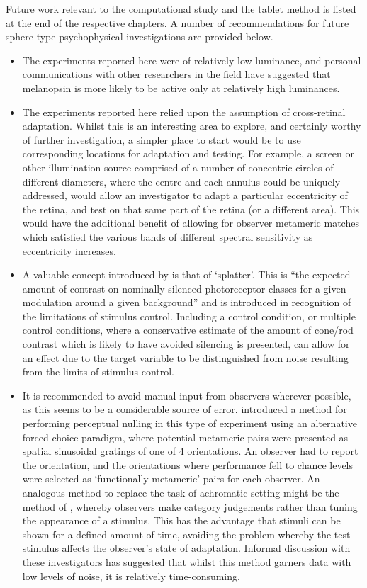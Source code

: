Future work relevant to the computational study and the tablet method is listed at the end of the respective chapters. A number of recommendations for future sphere-type psychophysical investigations are provided below.

\begin{itemize}
\item The experiments reported here were of relatively low luminance, and personal communications with other researchers in the field have suggested that melanopsin is more likely to be active only at relatively high luminances.
\item The experiments reported here relied upon the assumption of cross-retinal adaptation. Whilst this is an interesting area to explore, and certainly worthy of further investigation, a simpler place to start would be to use corresponding locations for adaptation and testing. For example, a screen or other illumination source comprised of a number of concentric circles of different diameters, where the centre and each annulus could be uniquely addressed, would allow an investigator to adapt a particular eccentricity of the retina, and test on that same part of the retina (or a different area). This would have the additional benefit of allowing for observer metameric matches which satisfied the various bands of different spectral sensitivity as eccentricity increases.
\item A valuable concept introduced by \citet{spitschan_selective_2015} is that of `splatter'. This is ``the expected amount of contrast on nominally silenced photoreceptor
classes for a given modulation around a given background'' and is introduced in recognition of the limitations of stimulus control. Including a control condition, or multiple control conditions, where a conservative estimate of the amount of cone/rod contrast which is likely to have avoided silencing is presented, can allow for an effect due to the target variable to be distinguished from noise resulting from the limits of stimulus control. 
\item It is recommended to avoid manual input from observers wherever possible, as this seems to be a considerable source of error. \citet{allen_form_2019} introduced a method for performing perceptual nulling in this type of experiment using an alternative forced choice paradigm, where potential metameric pairs were presented as spatial sinusoidal gratings of one of 4 orientations. An observer had to report the orientation, and the orientations where performance fell to chance levels were selected as `functionally metameric' pairs for each observer. An analogous method to replace the task of achromatic setting might be the method of \citet{smithson_colour_2004}, whereby observers make category judgements rather than tuning the appearance of a stimulus. This has the advantage that stimuli can be shown for a defined amount of time, avoiding the problem whereby the test stimulus affects the observer's state of adaptation. Informal discussion with these investigators has suggested that whilst this method garners data with low levels of noise, it is relatively time-consuming.

\end{itemize}
